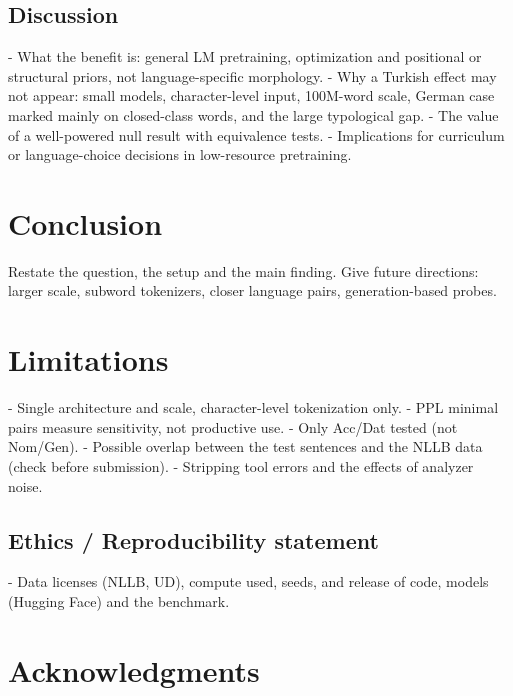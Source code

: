 \documentclass[11pt]{article}
\begin{document}
\subsection{Discussion}
- What the benefit is: general LM pretraining, optimization and positional or structural priors, not language-specific morphology.
- Why a Turkish effect may not appear: small models, character-level input, 100M-word scale, German case marked mainly on closed-class words, and the large typological gap.
- The value of a well-powered null result with equivalence tests.
- Implications for curriculum or language-choice decisions in low-resource pretraining.

\section{Conclusion}
Restate the question, the setup and the main finding. Give future directions: larger scale, subword tokenizers, closer language pairs, generation-based probes.

\section*{Limitations}
- Single architecture and scale, character-level tokenization only.
- PPL minimal pairs measure sensitivity, not productive use.
- Only Acc/Dat tested (not Nom/Gen).
- Possible overlap between the test sentences and the NLLB data (check before submission).
- Stripping tool errors and the effects of analyzer noise.

\subsection*{Ethics / Reproducibility statement}
- Data licenses (NLLB, UD), compute used, seeds, and release of code, models (Hugging Face) and the benchmark.

\section*{Acknowledgments}

\end{document}
